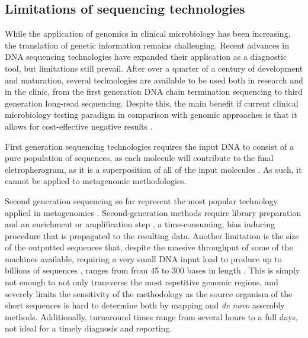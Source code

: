 \subsection{Limitations of sequencing technologies}

While the application of genomics in clinical microbiology has been increasing, the translation of genetic information remains challenging. Recent advances in DNA sequencing technologies have expanded their application as a diagnostic tool, but limitations still prevail. After over a quarter of a century of development and maturation, several technologies are available to be used both in research and in the clinic, from the first generation DNA chain termination sequencing to third generation long-read sequencing. Despite this, the main benefit if current clinical microbiology testing paradigm in comparison with genomic approaches is that it allows for cost-effective negative results \citep{greninger_challenge_2018}. 

First generation sequencing technologies requires the input \ac{DNA} to consist of a pure population of sequences, as each molecule will contribute to the final eletropherogram, as it is a superposition of all of the input molecules \citep{hagemann_overview_2015}. As such, it cannot be applied to metagenomic methodologies. 

Second generation sequencing so far represent the most popular technology applied in metagenomics \citep{rossen_practical_2018, loman_twenty_2015, loman_high-throughput_2012}. Second-generation methods require library preparation and an enrichment or amplification step \citep{hagemann_overview_2015}, a time-consuming, bias inducing procedure that is propagated to the resulting data. Another limitation is the size of the outputted sequences that, despite the massive throughput of some of the machines available, requiring a very small \ac{DNA} input load to produce up to billions of sequences \citep{loman_twenty_2015}, ranges from from 45 to 300 bases in length \citep{loman_performance_2012}. This is simply not enough to not only transverse the most repetitive genomic regions, and severely limits the sensitivity of the methodology as the source organism of the short sequences is hard to determine both by mapping and \textit{de novo} assembly methods. Additionally, turnaround times range from several hours to a full days, not ideal for a timely diagnosis and reporting.

